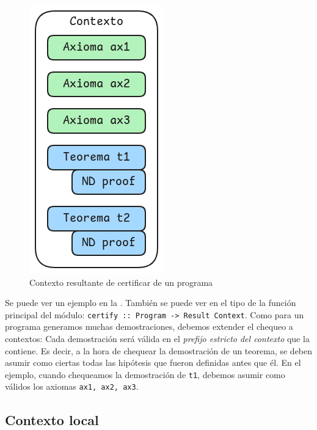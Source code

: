 \begin{figure}[h]
    \centering
    \begin{multicols}{2}
        \begin{tabular}{c}
            
        \end{tabular}
        \includegraphics[scale=0.5]{img/ppa-context.png}
    \end{multicols}
    \caption{Contexto resultante de certificar de un programa}
    \label{ppa-cert:fig:context}
\end{figure}


Se puede ver un ejemplo en la . También se puede ver
en el tipo de la función principal del módulo: \texttt{certify ::
Program -> Result Context}. Como para un programa generamos muchas
demostraciones, debemos extender el chequeo a contextos: Cada demostración será
válida en el \textit{prefijo estricto del contexto} que la contiene. Es decir, a
la hora de chequear la demostración de un teorema, se deben asumir como ciertas
todas las hipótesis que fueron definidas antes que él. En el ejemplo, cuando
chequeamos la demostración de \lstinline{t1}, debemos asumir como válidos los
axiomas \lstinline{ax1, ax2, ax3}.

\subsection{Contexto local}

